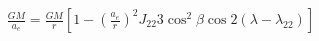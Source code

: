 \documentclass[10pt]{article}
\begin{document}
\begin{align*}\frac{G M}{a_{e}} = \frac{G M}{r} \left[ 1 - \left( \frac{a_{e}}{r} \right)^2 J_{22} 3 \cos^2 \beta \cos 2 \left( \lambda - \lambda_{22} \right) \right]\end{align*}
\end{document}
